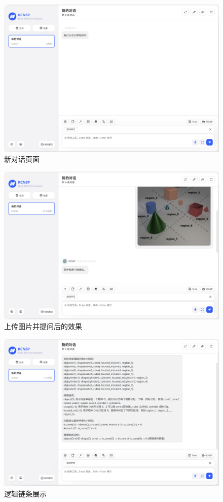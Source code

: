 \begin{figure}[h]
    \centering
    \includegraphics[scale=0.35]{figures/frontend-welcome-page.png}
    \caption{新对话页面}
    \label{fig:welcome-page}
\end{figure}
\begin{figure}[h]
    \centering
    \includegraphics[scale=0.3]{figures/question.png}
    \caption{上传图片并提问后的效果}
    \label{fig:question}
\end{figure}
\begin{figure}[h]
    \centering
    \includegraphics[scale=0.3]{figures/reasoning_path.png}
    \caption{逻辑链条展示}
    \label{fig:answer}
\end{figure}

